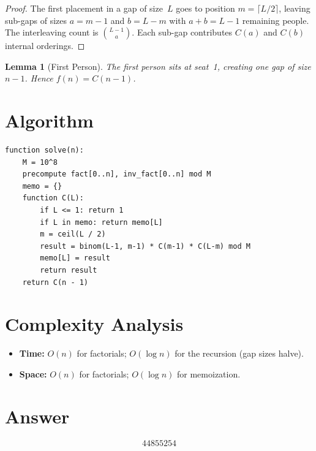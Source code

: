 \documentclass[11pt]{article}
\newtheorem{lemma}[theorem]{Lemma}
\begin{document}
\begin{proof}
The first placement in a gap of size~$L$ goes to position $m = \lceil L/2\rceil$, leaving sub-gaps of sizes $a = m-1$ and $b = L - m$ with $a + b = L - 1$ remaining people. The interleaving count is $\binom{L-1}{a}$. Each sub-gap contributes $C(a)$ and $C(b)$ internal orderings.
\end{proof}

\begin{lemma}[First Person]
The first person sits at seat~1, creating one gap of size $n-1$. Hence $f(n) = C(n-1)$.
\end{lemma}

\section{Algorithm}

\begin{verbatim}
function solve(n):
    M = 10^8
    precompute fact[0..n], inv_fact[0..n] mod M
    memo = {}
    function C(L):
        if L <= 1: return 1
        if L in memo: return memo[L]
        m = ceil(L / 2)
        result = binom(L-1, m-1) * C(m-1) * C(L-m) mod M
        memo[L] = result
        return result
    return C(n - 1)
\end{verbatim}

\section{Complexity Analysis}

\begin{itemize}
\item \textbf{Time:} $O(n)$ for factorials; $O(\log n)$ for the recursion (gap sizes halve).
\item \textbf{Space:} $O(n)$ for factorials; $O(\log n)$ for memoization.
\end{itemize}

\section{Answer}

\[
\boxed{44855254}
\]
\end{document}

